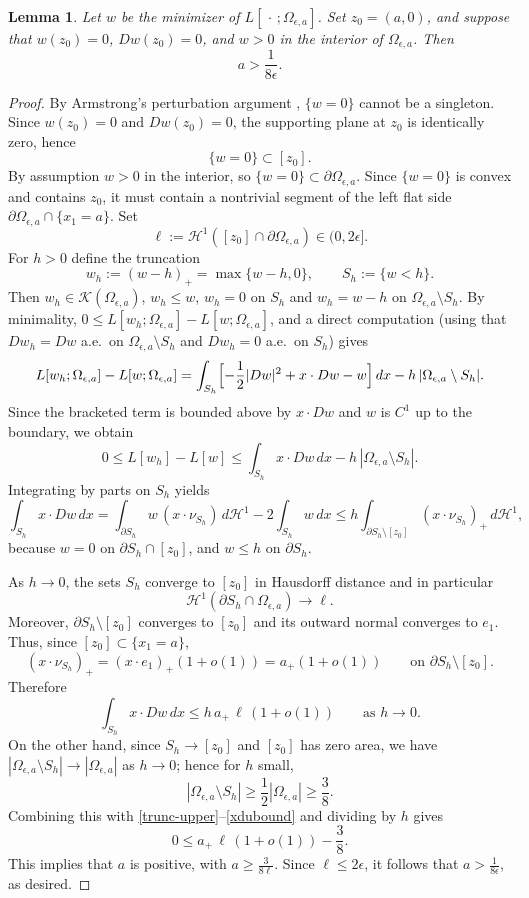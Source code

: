 \documentclass[reqno,11pt]{amsart}
\makeatletter
\newtheorem{lem}[thm]{Lemma}%
\numberwithin{equation}{section}
\theoremstyle{remark}
\makeatother
\begin{document}
\begin{lem}\label{left01}
Let $w$ be the minimizer of $L[\,\cdot\,;\Omega_{\epsilon,a}]$. Set $z_0=(a,0)$, and suppose that
$w(z_0)=0$, $Dw(z_0)=0$, and $w>0$ in the interior of $\Omega_{\epsilon,a}$.
Then
\[
a>\frac{1}{8\epsilon}.
\]
\end{lem}

\begin{proof}
By Armstrong's perturbation argument \cite{A1996}, $\{w=0\}$ cannot be a singleton.
Since $w(z_0)=0$ and $Dw(z_0)=0$, the supporting plane at $z_0$ is identically zero, hence
\[
\{w=0\}\subset [z_0].
\]
By assumption $w>0$ in the interior, so $\{w=0\}\subset \partial\Omega_{\epsilon,a}$.
Since $\{w=0\}$ is convex and contains $z_0$, it must contain a nontrivial segment of the left flat side
$\partial\Omega_{\epsilon,a}\cap\{x_1=a\}$.
Set
\[
\ell:=\mathscr H^1([z_0]\cap\partial\Omega_{\epsilon,a})\in(0,2\epsilon].
\]
For $h>0$ define the truncation
\[
w_h:=(w-h)_+=\max\{w-h,0\},
\qquad S_h:=\{w<h\}.
\]
Then $w_h\in\mathcal K(\Omega_{\epsilon,a})$, $w_h\le w$, $w_h=0$ on $S_h$ and $w_h=w-h$ on $\Omega_{\epsilon,a}\setminus S_h$.
By minimality, $0\le L[w_h;\Omega_{\epsilon,a}]-L[w;\Omega_{\epsilon,a}]$, and a direct computation
(using that $Dw_h=Dw$ a.e.\ on $\Omega_{\epsilon,a}\setminus S_h$ and $Dw_h=0$ a.e.\ on $S_h$)
gives
\[
L[w_h;\Omega_{\epsilon,a}]-L[w;\Omega_{\epsilon,a}]
=\int_{S_h}\Bigl[-\frac12|Dw|^2+x\cdot Dw-w\Bigr]\,dx
-h\,|\Omega_{\epsilon,a}\setminus S_h|.
\]
Since the bracketed term is bounded above by $x\cdot Dw$ and $w$ is $C^1$ up to the boundary, we obtain
\begin{equation}\label{trunc-upper}
0\le L[w_h]-L[w]\le \int_{S_h} x\cdot Dw\,dx - h\,|\Omega_{\epsilon,a}\setminus S_h|.
\end{equation}
Integrating by parts on $S_h$ yields
\[
\int_{S_h} x\cdot Dw\,dx
=\int_{\partial S_h} w\, (x\cdot\nu_{S_h})\,d\mathscr H^1 -2\int_{S_h} w\,dx
\le h\int_{\partial S_h\setminus [z_0]} (x\cdot\nu_{S_h})_+\,d\mathscr H^1,
\]
because $w=0$ on $\partial S_h\cap[z_0]$, and $w\le h$ on $\partial S_h$.

As $h\to0$, the sets $S_h$ converge to $[z_0]$ in Hausdorff distance and in particular
\[
\mathscr H^1(\partial S_h\cap\Omega_{\epsilon,a})\to \ell.
\]
Moreover, $\partial S_h\setminus [z_0]$ converges to $[z_0]$ and its outward normal converges to $e_1$.
Thus, since $[z_0]\subset \{x_1=a\}$,
\[
(x\cdot\nu_{S_h})_+=(x\cdot e_1)_+(1+o(1))=a_+(1+o(1))
\qquad \text{on }\partial S_h\setminus [z_0].
\]
Therefore
\begin{equation}\label{xdubound}
\int_{S_h} x\cdot Dw\,dx \le h\,a_+\,\ell\,(1+o(1))
\qquad\text{as }h\to0.
\end{equation}
On the other hand, since $S_h\to [z_0]$ and $[z_0]$ has zero area, we have
$|\Omega_{\epsilon,a}\setminus S_h|\to|\Omega_{\epsilon,a}|$ as $h\to0$; hence for $h$ small,
\[
|\Omega_{\epsilon,a}\setminus S_h|\ge \frac12|\Omega_{\epsilon,a}|\ge \frac38.
\]
Combining this with \eqref{trunc-upper}--\eqref{xdubound} and dividing by $h$ gives
\[
0\le a_+\,\ell\,(1+o(1))-\frac38.
\]
This implies that $a$ is positive, with $a\ge \frac{3}{8\ell}$.
Since $\ell\le 2\epsilon$, it follows that $a> \frac{1}{8\epsilon}$, as desired.
\end{proof}
\end{document}
